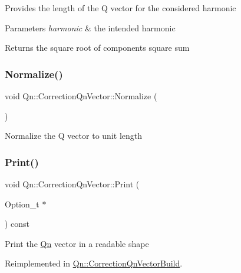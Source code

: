 Provides the length of the Q vector for the considered harmonic 
\begin{DoxyParams}{Parameters}
{\em harmonic} & the intended harmonic \\
\hline
\end{DoxyParams}
\begin{DoxyReturn}{Returns}
the square root of components square sum 
\end{DoxyReturn}
\mbox{\label{classQn_1_1CorrectionQnVector_a8e2e40587de98b65ec6b89ce82fb63a7}} 
\subsubsection{\texorpdfstring{Normalize()}{Normalize()}}
{\footnotesize\ttfamily void Qn\+::\+Correction\+Qn\+Vector\+::\+Normalize (\begin{DoxyParamCaption}{ }\end{DoxyParamCaption})}

Normalize the Q vector to unit length \mbox{\label{classQn_1_1CorrectionQnVector_a859e8ffe20c7a607f67bb95f8c85b9e9}} 
\subsubsection{\texorpdfstring{Print()}{Print()}}
{\footnotesize\ttfamily void Qn\+::\+Correction\+Qn\+Vector\+::\+Print (\begin{DoxyParamCaption}\item[{Option\+\_\+t $\ast$}]{ }\end{DoxyParamCaption}) const\hspace{0.3cm}{\ttfamily [virtual]}}

Print the \mbox{\hyperlink{namespaceQn}{Qn}} vector in a readable shape 

Reimplemented in \mbox{\hyperlink{classQn_1_1CorrectionQnVectorBuild_a8b767040ac4ae2472e8ce8f091b5ce88}{Qn\+::\+Correction\+Qn\+Vector\+Build}}.

\mbox{\label{classQn_1_1CorrectionQnVector_a7a72044374f9040ebfdc364e574f0cca}} 
